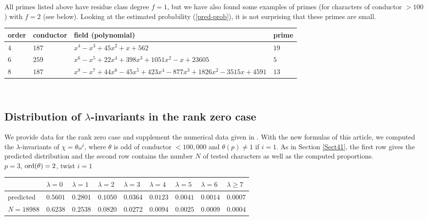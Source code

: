 \documentclass[pdflatex,sn-mathphys-num]{sn-jnl}%
\theoremstyle{plain}
\theoremstyle{definition}
\theoremstyle{remark}
\numberwithin{equation}{section}
\newcommand{\ord}{\text{\rm ord}}
\begin{document}
\bigskip

All primes listed above have residue class degree $f=1$, but we have also found some examples of primes  (for characters of conductor $>100$) with $f=2$ (see below). Looking at the estimated probability (\ref{pred-prob}), it is not surprising that these primes are small.\\

\noindent \begin{tabular}{|l|l|l|l|} \hline
order & conductor & field (polynomial) & prime\\ \hline
$4$ & $187$ & $x^4 - x^3 + 45 x^2 + x + 562$ & $19 $ \\ \hline
\hline
$6$ & $259$ & $x^6 - x^5 + 22 x^4 + 398 x^3 + 1051 x^2 - x + 23605$ & $5 $  \\ \hline
\hline
$8$ & $187$ & $x^8 - x^7 + 44 x^6 - 45 x^5 + 423 x^4 - 877 x^3 + 1826 x^2 - 3515 x + 4591$ & $13 $  \\ \hline 
\end{tabular}\\


\bigskip

\subsection{Distribution of $\lambda$-invariants in the rank zero case} 

We provide data for the rank zero case and supplement the numerical data given in \cite{DeKn}. 
With the new formulas of this article, we computed the $\lambda$-invariants of $\chi = \theta \omega^ i$, where $\theta$ is odd of conductor $<100,000$ and $\theta(p) \neq 1$ if $i=1$. As in Section \ref{Sect41}, the first row gives the predicted distribution and the second row contains the number $N$ of tested characters as well as the computed proportions. \\

\noindent $p=3$, $\ord(\theta)=2$, twist $i=1$\\
\begin{tabular}{|l|l|l|l|l|l|l|l|l|} \hline
& $\lambda=0$ & $\lambda=1$ & $\lambda=2$ & $\lambda=3$ & $\lambda=4$ & $\lambda=5$ & $\lambda=6$ & $\lambda\geq 7$ \\ \hline
predicted & $0.5601$ & $0.2801$ & $0.1050$ & $0.0364$ & $0.0123$ & $0.0041$ & $0.0014$ & $0.0007$ \\ \hline
$N=18988$ & $0.6238$ & $0.2538$ & $0.0820$ & $0.0272$ & $0.0094$ & $0.0025$ & $0.0009$ & $0.0004$  \\ \hline
\end{tabular}\\
\end{document}
